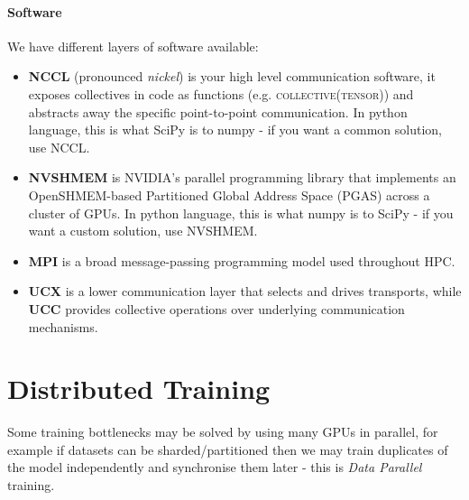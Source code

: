 \paragraph{Software}
We have different layers of software available:
\begin{itemize}
    \item \textbf{NCCL} (pronounced \textit{nickel}) is your high level communication software, it exposes collectives in code as functions (e.g. \textsc{collective(tensor)}) and abstracts away the specific point-to-point communication. 
    In python language, this is what SciPy is to numpy - if you want a common solution, use NCCL.
    \item \textbf{NVSHMEM} is NVIDIA’s parallel programming library that implements an OpenSHMEM-based Partitioned Global Address Space (PGAS) across a cluster of GPUs. 
    In python language, this is what numpy is to SciPy - if you want a custom solution, use NVSHMEM.
    \item \textbf{MPI} is a broad message-passing programming model used throughout HPC.
    \item \textbf{UCX} is a lower communication layer that selects and drives transports, while \textbf{UCC} provides collective operations over underlying communication mechanisms.
\end{itemize}


\section{Distributed Training}
\label{sec:hardware-parallelism}
Some training bottlenecks may be solved by using many GPUs in parallel, for example if datasets can be sharded/partitioned then we may train duplicates of the model independently and synchronise them later - this is \textit{Data Parallel} training.

